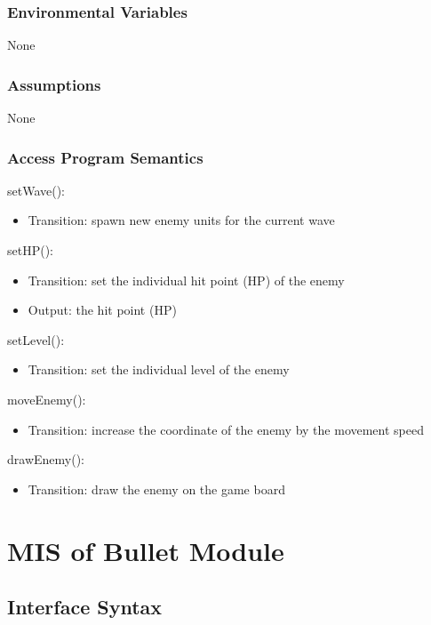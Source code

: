 \documentclass[12,english]{article}
\begin{document}
\subsubsection{Environmental Variables}
None
\subsubsection{Assumptions}
None
\subsubsection{Access Program Semantics}

\noindent setWave():
\begin{itemize}
    \item Transition: spawn new enemy units for the current wave
\end{itemize}

\noindent setHP():
\begin{itemize}
    \item Transition: set the individual hit point (HP) of the enemy
    \item Output: the hit point (HP)
\end{itemize}

\noindent setLevel():
\begin{itemize}
    \item Transition: set the individual level of the enemy
\end{itemize}

\noindent moveEnemy():
\begin{itemize}
    \item Transition: increase the coordinate of the enemy by the movement speed
\end{itemize}

\noindent drawEnemy():
\begin{itemize}
    \item Transition: draw the enemy on the game board
\end{itemize}



\section{MIS of Bullet Module}
\subsection{Interface Syntax}
\end{document}
